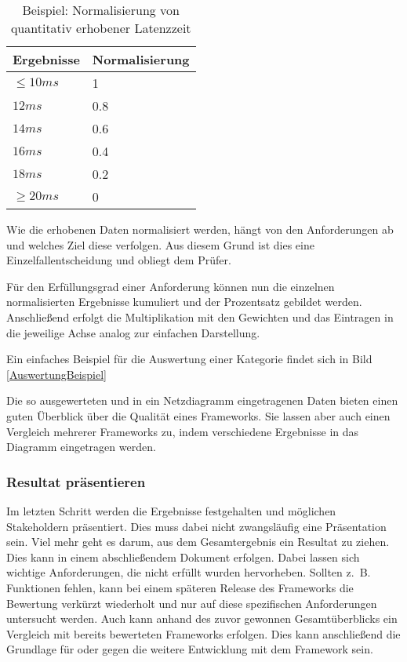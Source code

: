 \begin{table}[!h]
	\centering
	\begin{tabular}{ll}
		\textbf{Ergebnisse} & \textbf{Normalisierung}\\
		\hline
		$\le 10ms$ 		& 1  	\\
		\hline
		$12ms$			& 0.8	\\
		\hline
		$14ms$			& 0.6  	\\
		\hline
		$16ms$			& 0.4  	\\
		\hline
		$18ms$			& 0.2  	\\
		\hline
		$\ge 20ms$		& 0  	\\
		\hline
	\end{tabular}
	\caption[Normalisierung quantitativer Daten]{Beispiel: Normalisierung von quantitativ erhobener Latenzzeit}
	\label{Normalisierung_quant}
\end{table}

Wie die erhobenen Daten normalisiert werden, hängt von den Anforderungen ab und welches Ziel diese verfolgen. Aus diesem Grund ist dies eine Einzelfallentscheidung und obliegt dem Prüfer.

Für den Erfüllungsgrad einer Anforderung können nun die einzelnen normalisierten Ergebnisse kumuliert und der Prozentsatz gebildet werden. Anschließend erfolgt die Multiplikation mit den Gewichten und das Eintragen in die jeweilige Achse analog zur einfachen Darstellung. 

Ein einfaches Beispiel für die Auswertung einer Kategorie findet sich in Bild \ref{AuswertungBeispiel}


Die so ausgewerteten und in ein Netzdiagramm eingetragenen Daten bieten einen guten Überblick über die Qualität eines Frameworks. Sie lassen aber auch einen Vergleich mehrerer Frameworks zu, indem verschiedene Ergebnisse in das Diagramm eingetragen werden.

\subsubsection{Resultat präsentieren}

Im letzten Schritt werden die Ergebnisse festgehalten und möglichen Stakeholdern präsentiert. Dies muss dabei nicht zwangsläufig eine Präsentation sein. Viel mehr geht es darum, aus dem Gesamtergebnis ein Resultat zu ziehen. Dies kann in einem abschließendem Dokument erfolgen. Dabei lassen sich wichtige Anforderungen, die nicht erfüllt wurden hervorheben. Sollten z.~B. Funktionen fehlen, kann bei einem späteren Release des Frameworks die Bewertung verkürzt wiederholt und nur auf diese spezifischen Anforderungen untersucht werden.
Auch kann anhand des zuvor gewonnen Gesamtüberblicks ein Vergleich mit bereits bewerteten Frameworks erfolgen. Dies kann anschließend die Grundlage für oder gegen die weitere Entwicklung mit dem Framework sein.

\pagebreak












